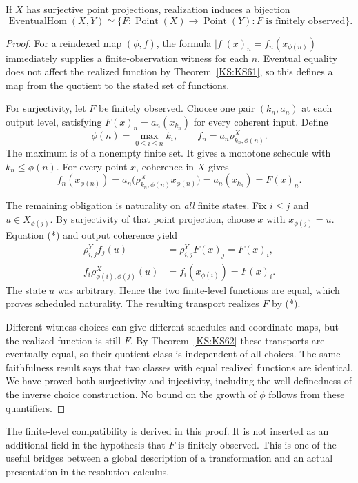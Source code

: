 \begin{KStheorem}\label{KS:KS63}
If \(X\) has surjective point projections, realization induces a bijection
\[
 \operatorname{EventualHom}(X,Y)
 \simeq
 \{F:\operatorname{Point}(X)\to\operatorname{Point}(Y):F
 \text{ is finitely observed}\}.
\]
\end{KStheorem}
\begin{proof}
For a reindexed map $(\phi,f)$, the formula $|f|(x)_n=f_n(x_{\phi(n)})$ immediately supplies a finite-observation witness for each $n$. Eventual equality does not affect the realized function by Theorem~\ref{KS:KS61}, so this defines a map from the quotient to the stated set of functions.

For surjectivity, let $F$ be finitely observed. Choose one pair $(k_n,a_n)$ at each output level, satisfying $F(x)_n=a_n(x_{k_n})$ for every coherent input. Define
\[
 \phi(n)=\max_{0\le i\le n}k_i,
 \qquad f_n=a_n\rho^X_{k_n,\phi(n)}.
\]
The maximum is of a nonempty finite set. It gives a monotone schedule with $k_n\le\phi(n)$. For every point $x$, coherence in $X$ gives
\[
 f_n(x_{\phi(n)})
 =a_n\bigl(\rho^X_{k_n,\phi(n)}x_{\phi(n)}\bigr)
 =a_n(x_{k_n})=F(x)_n.                                      \tag{*}
\]

The remaining obligation is naturality on \emph{all} finite states. Fix $i\le j$ and $u\in X_{\phi(j)}$. By surjectivity of that point projection, choose $x$ with $x_{\phi(j)}=u$. Equation (*) and output coherence yield
\[
\begin{aligned}
 \rho^Y_{i,j}f_j(u)&=\rho^Y_{i,j}F(x)_j=F(x)_i,\\
 f_i\rho^X_{\phi(i),\phi(j)}(u)&=f_i(x_{\phi(i)})=F(x)_i.
\end{aligned}
\]
The state $u$ was arbitrary. Hence the two finite-level functions are equal, which proves scheduled naturality. The resulting transport realizes $F$ by (*).

Different witness choices can give different schedules and coordinate maps, but the realized function is still $F$. By Theorem~\ref{KS:KS62} these transports are eventually equal, so their quotient class is independent of all choices. The same faithfulness result says that two classes with equal realized functions are identical. We have proved both surjectivity and injectivity, including the well-definedness of the inverse choice construction. No bound on the growth of $\phi$ follows from these quantifiers.
\end{proof}
The finite-level compatibility is derived in this proof. It is not inserted as an additional field in the hypothesis that \(F\) is finitely observed. This is one of the useful bridges between a global description of a transformation and an actual presentation in the resolution calculus.


